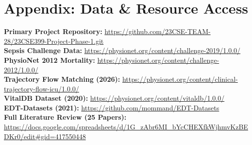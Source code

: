 \documentclass[11pt, a4paper]{article}
\begin{document}
\vspace{0.2cm}
\section*{Appendix: Data \& Resource Access}
\scriptsize
\textbf{Primary Project Repository:} \url{https://github.com/23CSE-TEAM-28/23CSE399-Project-Phase-1.git} \\
\textbf{Sepsis Challenge Data:} \url{https://physionet.org/content/challenge-2019/1.0.0/} \\
\textbf{PhysioNet 2012 Mortality:} \url{https://physionet.org/content/challenge-2012/1.0.0/} \\
\textbf{Trajectory Flow Matching (2026):} \url{https://physionet.org/content/clinical-trajectory-flow-icu/1.0.0/} \\
\textbf{VitalDB Dataset (2020):} \url{https://physionet.org/content/vitaldb/1.0.0/} \\
\textbf{EDT-Datasets (2021):} \url{https://github.com/mommand/EDT-Datasets} \\
\textbf{Full Literature Review (25 Papers):} \url{https://docs.google.com/spreadsheets/d/1G_zAbr6MI_bYcCHEXfkWjhmvKzBEDKr0/edit\#gid=417550448} \\
\normalsize

\nocite{churaev2023,jothimurugesan2022,arivazhagan2020,mcmahan2017,liu2022}
\nocite{yang2025mvfl,kalakoti2025fedxai,noseda2025financial,karamanlioglu2025clinical,wang2025personalized}
\nocite{abdelsater2024llama,maher2025automl,gupta2025privacy,yuan2024trend,tang2025horizon}
\nocite{zhang2022multitask,larocca2021attention,amato2023clustering,larocca2022shap,bernardi2023adaptive}
\nocite{dusing2025sepsis,qayyum2023fedsepsis,lei2025supervised,pan2025multiprog,maurya2025secure}



\end{document}
